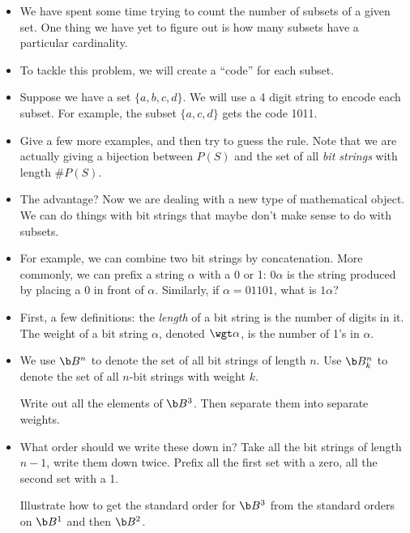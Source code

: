 \begin{itemize}

\item We have spent some time trying to count the number of subsets of a given set.  One thing we have yet to figure out is how many subsets have a particular cardinality.

\item To tackle this problem, we will create a ``code'' for each subset.  

\item Suppose we have a set $\{a, b, c, d\}$.  We will use a 4 digit string to encode each subset. For example, the subset $\{a,c,d\}$ gets the code 1011. 

\item Give a few more examples, and then try to guess the rule.  Note that we are actually giving a bijection between $P(S)$ and the set of all {\em bit strings} with length $\#P(S)$.

\item The advantage?  Now we are dealing with a new type of mathematical object.  We can do things with bit strings that maybe don't make sense to do with subsets.

\item For example, we can combine two bit strings by concatenation.  More commonly, we can prefix a string $\alpha$ with a 0 or 1: $0\alpha$ is the string produced by placing a 0 in front of $\alpha$.  Similarly, if $\alpha = 01101$, what is $1\alpha$?

\item First, a few definitions: the {\em length} of a bit string is the number of digits in it. The weight of a bit string $\alpha$, denoted $\wgt \alpha$, is the number of 1's in $\alpha$.

\item We use $\b B^n$ to denote the set of all bit strings of length $n$.  Use $\b B^n_k$ to denote the set of all $n$-bit strings with weight $k$.

\ex Write out all the elements of $\b B^3$.  Then separate them into separate weights.

\item What order should we write these down in?  Take all the bit strings of length $n-1$, write them down twice.  Prefix all the first set with a zero, all the second set with a 1.

\ex Illustrate how to get the standard order for $\b B^3$ from the standard orders on $\b B^1$ and then $\b B^2$.


\end{itemize}
